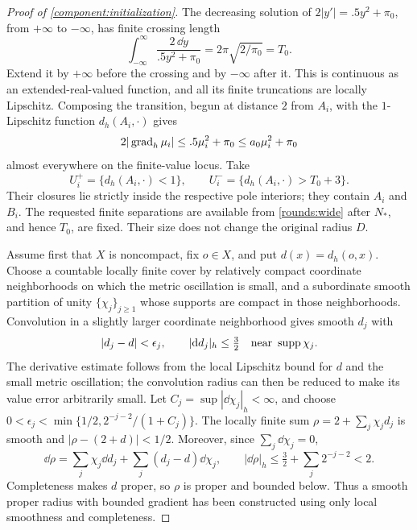 \begin{proof}[Proof of \cref{component:initialization}]
The decreasing solution of
$2|y'|=.5y^2+\pi_0$, from $+\infty$ to $-\infty$, has finite
crossing length
\[
 \int_{-\infty}^{\infty}\frac{2\,\dd y}{.5y^2+\pi_0}
       =2\pi\sqrt{2/\pi_0}=T_0.
\]
Extend it by $+\infty$ before the crossing and by $-\infty$ after
it.  This is continuous as an extended-real-valued function, and
all its finite truncations are locally Lipschitz.  Composing the
transition, begun at distance $2$ from $A_i$, with the $1$-Lipschitz
function $d_h(A_i,\cdot)$ gives
\[
 2|\operatorname{grad}_h\mu_i|\le .5\mu_i^2+\pi_0
                    \le a_0\mu_i^2+\pi_0
\]
almost everywhere on the finite-value locus.  Take
\[
 U_i^+=\{d_h(A_i,\cdot)<1\},\qquad
 U_i^-=\{d_h(A_i,\cdot)>T_0+3\}.
\]
Their closures lie strictly inside the respective pole interiors;
they contain $A_i$ and $B_i$.  The requested finite separations are
available from \cref{rounds:wide} after $N_*$, and hence $T_0$, are
fixed.  Their size does not change the original radius $D$.

Assume first that $X$ is noncompact, fix $o\in X$, and
put $d(x)=d_h(o,x)$.  Choose a countable locally finite cover by
relatively compact coordinate neighborhoods on which the metric
oscillation is small, and a subordinate smooth partition of unity
$\{\chi_j\}_{j\ge1}$ whose supports are compact in those neighborhoods.
Convolution in a slightly larger coordinate neighborhood gives
smooth $d_j$ with
\[
 |d_j-d|<\epsilon_j,\qquad |\mathrm d d_j|_h\le\tfrac32
       \quad\hbox{near }\operatorname{supp}\chi_j.
\]
The derivative estimate follows from the local Lipschitz bound for
$d$ and the small metric oscillation; the convolution radius can
then be reduced to make its value error arbitrarily small.
Let $C_j=\sup|\dd\chi_j|_h<\infty$, and choose
$0<\epsilon_j<\min\{1/2,2^{-j-2}/(1+C_j)\}$.
The locally finite sum $\rho=2+\sum_j\chi_jd_j$ is smooth and
$|\rho-(2+d)|<1/2$.  Moreover, since $\sum_j\dd\chi_j=0$,
\[
 \dd\rho=\sum_j\chi_j\dd d_j
             +\sum_j(d_j-d)\dd\chi_j,
 \qquad |\dd\rho|_h\le\tfrac32+\sum_j2^{-j-2}<2.
\]
Completeness makes $d$ proper, so $\rho$ is proper and bounded below.
Thus a smooth proper radius with bounded gradient has been constructed
using only local smoothness and completeness.


\end{proof}
